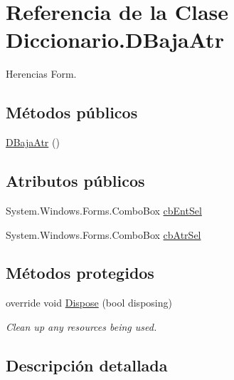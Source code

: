 \hypertarget{class_diccionario_1_1_d_baja_atr}{\section{Referencia de la Clase Diccionario.\-D\-Baja\-Atr}
\label{class_diccionario_1_1_d_baja_atr}
}


Herencias Form.

\subsection*{Métodos públicos}
\begin{DoxyCompactItemize}
\item 
\hyperlink{class_diccionario_1_1_d_baja_atr_ac267c32d1ffc69089f21739682675012}{D\-Baja\-Atr} ()
\end{DoxyCompactItemize}
\subsection*{Atributos públicos}
\begin{DoxyCompactItemize}
\item 
System.\-Windows.\-Forms.\-Combo\-Box \hyperlink{class_diccionario_1_1_d_baja_atr_a448d04549fdde2794125791a291d202d}{cb\-Ent\-Sel}
\item 
System.\-Windows.\-Forms.\-Combo\-Box \hyperlink{class_diccionario_1_1_d_baja_atr_a4043ff7bb4375a6c637cab06e1b8074e}{cb\-Atr\-Sel}
\end{DoxyCompactItemize}
\subsection*{Métodos protegidos}
\begin{DoxyCompactItemize}
\item 
override void \hyperlink{class_diccionario_1_1_d_baja_atr_aca2ef2bb9cac4da0f170c781913dbe15}{Dispose} (bool disposing)
\begin{DoxyCompactList}\small\item\em Clean up any resources being used. \end{DoxyCompactList}\end{DoxyCompactItemize}


\subsection{Descripción detallada}


